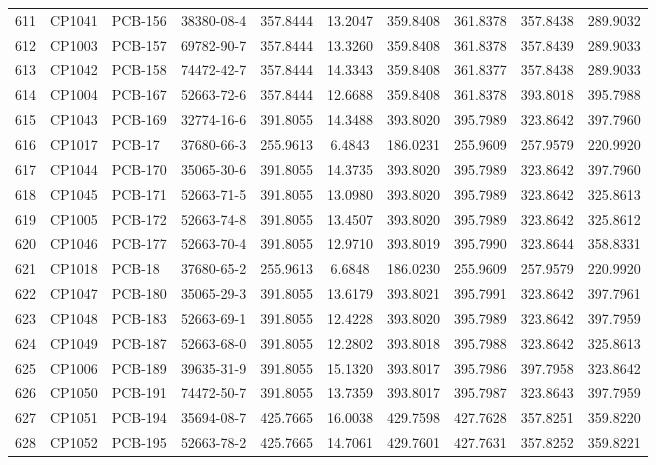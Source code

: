\begin{longtable}{clllcccccc}
611 & CP1041 & PCB-156 & 38380-08-4 & 357.8444 & 13.2047 & 359.8408 & 361.8378 & 357.8438 & 289.9032 \\ 
612 & CP1003 & PCB-157 & 69782-90-7 & 357.8444 & 13.3260 & 359.8408 & 361.8378 & 357.8439 & 289.9033 \\ 
613 & CP1042 & PCB-158 & 74472-42-7 & 357.8444 & 14.3343 & 359.8408 & 361.8377 & 357.8438 & 289.9033 \\ 
614 & CP1004 & PCB-167 & 52663-72-6 & 357.8444 & 12.6688 & 359.8408 & 361.8378 & 393.8018 & 395.7988 \\ 
615 & CP1043 & PCB-169 & 32774-16-6 & 391.8055 & 14.3488 & 393.8020 & 395.7989 & 323.8642 & 397.7960 \\ 
616 & CP1017 & PCB-17 & 37680-66-3 & 255.9613 & 6.4843 & 186.0231 & 255.9609 & 257.9579 & 220.9920 \\ 
617 & CP1044 & PCB-170 & 35065-30-6 & 391.8055 & 14.3735 & 393.8020 & 395.7989 & 323.8642 & 397.7960 \\ 
618 & CP1045 & PCB-171 & 52663-71-5 & 391.8055 & 13.0980 & 393.8020 & 395.7989 & 323.8642 & 325.8613 \\ 
619 & CP1005 & PCB-172 & 52663-74-8 & 391.8055 & 13.4507 & 393.8020 & 395.7989 & 323.8642 & 325.8612 \\ 
620 & CP1046 & PCB-177 & 52663-70-4 & 391.8055 & 12.9710 & 393.8019 & 395.7990 & 323.8644 & 358.8331 \\ 
621 & CP1018 & PCB-18 & 37680-65-2 & 255.9613 & 6.6848 & 186.0230 & 255.9609 & 257.9579 & 220.9920 \\ 
622 & CP1047 & PCB-180 & 35065-29-3 & 391.8055 & 13.6179 & 393.8021 & 395.7991 & 323.8642 & 397.7961 \\ 
623 & CP1048 & PCB-183 & 52663-69-1 & 391.8055 & 12.4228 & 393.8020 & 395.7989 & 323.8642 & 397.7959 \\ 
624 & CP1049 & PCB-187 & 52663-68-0 & 391.8055 & 12.2802 & 393.8018 & 395.7988 & 323.8642 & 325.8613 \\ 
625 & CP1006 & PCB-189 & 39635-31-9 & 391.8055 & 15.1320 & 393.8017 & 395.7986 & 397.7958 & 323.8642 \\ 
626 & CP1050 & PCB-191 & 74472-50-7 & 391.8055 & 13.7359 & 393.8017 & 395.7987 & 323.8643 & 397.7959 \\ 
627 & CP1051 & PCB-194 & 35694-08-7 & 425.7665 & 16.0038 & 429.7598 & 427.7628 & 357.8251 & 359.8220 \\ 
628 & CP1052 & PCB-195 & 52663-78-2 & 425.7665 & 14.7061 & 429.7601 & 427.7631 & 357.8252 & 359.8221 \\ 

\end{longtable}
